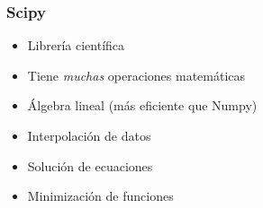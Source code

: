\documentclass[14pt,aspectratio=169,xcolor=dvipsnames]{beamer}
\begin{document}
\begin{frame}\frametitle{}
\end{frame}
\begin{frame}\frametitle{Scipy}
    \begin{itemize}
        \item Librería científica
        \item Tiene \emph{muchas} operaciones matemáticas
        \item Álgebra lineal (más eficiente que Numpy)
        \item Interpolación de datos
        \item Solución de ecuaciones
        \item Minimización de funciones
    \end{itemize}
\end{frame}
\end{document}
